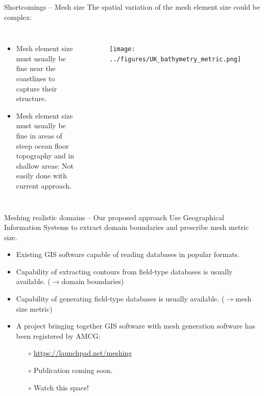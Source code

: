 \documentclass[t]{beamer}
\begin{document}
\begin{frame}{Shortcomings -- Mesh size}
The spatial variation of the mesh element size could be complex:
\begin{columns}
\begin{itemize}
   \item Mesh element size must usually be fine near the coastlines to capture their structure.\\[15pt]
   \item Mesh element size must usually be fine in areas of steep ocean floor topography and in shallow areas: Not easily done with current approach.
\end{itemize}
\begin{figure}[htbp!]
 \centering
  \texttt{[image: ../figures/UK\_bathymetry\_metric.png]}
\end{figure}
\end{columns}
\end{frame}

\begin{frame}{Meshing realistic domains -- Our proposed approach}
Use Geographical Information Systems to extract domain boundaries and prescribe mesh metric size.
\begin{itemize}
   \item Existing GIS software capable of reading databases in popular formats.
   \item Capability of extracting contours from field-type databases is usually available. ($\rightarrow$domain boundaries)
   \item Capability of generating field-type databases is usually available. ($\rightarrow$mesh size metric)
   \item A project bringing together GIS software with mesh generation software has been registered by AMCG:
   \begin{itemize}
      \item[$\circ$] \url{https://launchpad.net/meshing}
      \item[$\circ$] Publication coming soon.
      \item[$\circ$] Watch this space!
   \end{itemize}
\end{itemize}
\end{frame}
\end{document}
